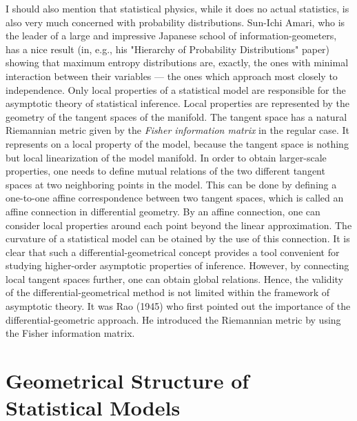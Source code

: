I should also mention that statistical physics, while it does no actual statistics, 
is also very much concerned
with probability distributions. Sun-Ichi Amari, who is the leader of a large and impressive 
Japanese school of information-geometers, has a nice result
(in, e.g., his "Hierarchy of Probability Distributions" paper) 
showing that maximum entropy distributions are, exactly, 
the ones with minimal interaction between their variables --- 
the ones which approach most closely to independence.
        Only local properties of a statistical model are responsible for the asymptotic theory of statistical
 inference. Local properties are represented by the geometry of the tangent spaces of the manifold. The tangent 
 space has a natural Riemannian metric given by the \textit{Fisher information matrix} in the regular case.
 It represents on a local property of the model, because the tangent space is nothing but local linearization of the 
 model manifold. In order to obtain larger-scale properties, one needs to define mutual relations of the two 
 different tangent spaces at two neighboring points in the model. This can be done by defining a one-to-one affine
 correspondence between two tangent spaces, which is called an affine connection in differential geometry. 
 By an affine connection, one can consider local properties around each point beyond the linear approximation.
 The curvature of a statistical model can be otained by the use of this connection.
 It is clear that such a differential-geometrical concept provides a tool convenient for studying higher-order 
 asymptotic properties of inference. However, by connecting local tangent spaces further, one can obtain global
 relations. Hence, the validity of the differential-geometrical method is not limited within the framework of
 asymptotic theory. 
        It was Rao (1945) who first pointed out the importance of the differential-geometric approach. He introduced 
        the Riemannian metric by using the Fisher information matrix.
\section{Geometrical Structure of Statistical Models}
